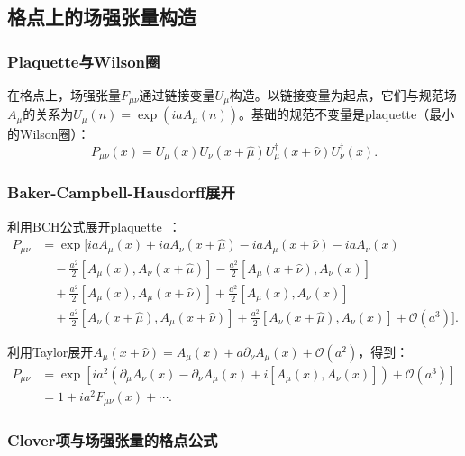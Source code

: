 \documentclass[12pt,a4paper]{ctexart}
\theoremstyle{definition}
\begin{document}
\subsection{格点上的场强张量构造}

\subsubsection{Plaquette与Wilson圈}

在格点上，场强张量$F_{\mu\nu}$通过链接变量$U_\mu$构造。以链接变量为起点，它们与规范场$A_\mu$的关系为$U_\mu(n) = \exp(i a A_\mu(n))$。基础的规范不变量是plaquette（最小的Wilson圈）：
\begin{equation}\label{eq:plaquette}
    P_{\mu\nu}(x) = U_\mu(x) U_\nu(x+\hat{\mu}) U^\dagger_\mu(x+\hat{\nu}) U^\dagger_\nu(x).
\end{equation}

\subsubsection{Baker-Campbell-Hausdorff展开}

利用BCH公式展开plaquette~\cite{Fmununote}：
\begin{align}
    P_{\mu\nu} &= \exp\bigg[ i a A_\mu(x) + i a A_\nu(x+\hat{\mu}) - i a A_\mu(x+\hat{\nu}) - i a A_\nu(x) \nonumber\\
    &\quad -\frac{a^2}{2}[A_\mu(x), A_\nu(x+\hat{\mu})] - \frac{a^2}{2}[A_\mu(x+\hat{\nu}), A_\nu(x)] \nonumber\\
    &\quad +\frac{a^2}{2}[A_\mu(x), A_\mu(x+\hat{\nu})] + \frac{a^2}{2}[A_\mu(x), A_\nu(x)] \nonumber\\
    &\quad +\frac{a^2}{2}[A_\nu(x+\hat{\mu}), A_\mu(x+\hat{\nu})] + \frac{a^2}{2}[A_\nu(x+\hat{\mu}), A_\nu(x)] + \mathcal{O}(a^3) \bigg].
\end{align}

利用Taylor展开$A_\mu(x+\hat{\nu}) = A_\mu(x) + a \partial_\nu A_\mu(x) + \mathcal{O}(a^2)$，得到：
\begin{align}
    P_{\mu\nu} &= \exp\!\left[i a^2 \left(\partial_\mu A_\nu(x) - \partial_\nu A_\mu(x) + i [A_\mu(x), A_\nu(x)]\right) + \mathcal{O}(a^3)\right] \nonumber\\
    &= 1 + i a^2 F_{\mu\nu}(x) + \cdots.
\end{align}

\subsubsection{Clover项与场强张量的格点公式}
\end{document}
